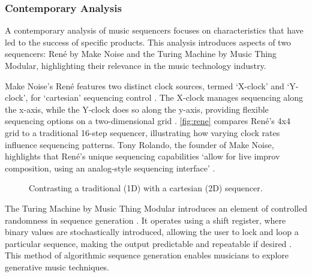 \documentclass[12pt]{article}
\newcounter{subsubsubsection}[subsubsection]
\numberwithin{subsubsubsection}{subsubsection}
\begin{document}
\subsubsection{Contemporary Analysis}

A contemporary analysis of music sequencers focuses on characteristics that have led to the success of specific products. This analysis introduces aspects of two sequencers: René by Make Noise and the Turing Machine by Music Thing Modular, highlighting their relevance in the music technology industry.


Make Noise's René features two distinct clock sources, termed `X-clock' and `Y-clock', for `cartesian' sequencing control \cite{Bjorn2}. The X-clock manages sequencing along the x-axis, while the Y-clock does so along the y-axis, providing flexible sequencing options on a two-dimensional grid  \cite{Bjorn2}. \autoref{fig:rene} compares René's 4x4 grid to a traditional 16-step sequencer, illustrating how varying clock rates influence sequencing patterns. Tony Rolando, the founder of Make Noise, highlights that René's unique sequencing capabilities `allow for live improv composition, using an analog-style sequencing interface' \cite{Rolando1}.

\begin{figure}[ht]
    \centering
    \caption{Contrasting a traditional (1D) with a cartesian (2D) sequencer.}
    \label{fig:rene}
\end{figure}


The Turing Machine by Music Thing Modular introduces an element of controlled randomness in sequence generation \cite{Turing}. It operates using a shift register, where binary values are stochastically introduced, allowing the user to lock and loop a particular sequence, making the output predictable and repeatable if desired \cite{Turing}. This method of algorithmic sequence generation enables musicians to explore generative music techniques. 
\end{document}
